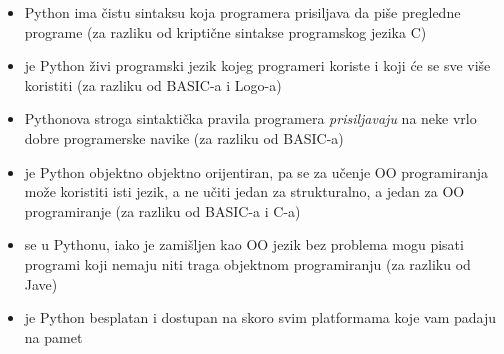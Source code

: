 	\begin{itemize}
		\item Python ima \v{c}istu sintaksu koja programera prisiljava da pi\v{s}e
			pregledne programe (za razliku od kripti\v{c}ne sintakse programskog jezika
			C)
		\item je Python \v{z}ivi programski jezik kojeg programeri koriste i koji \'{c}e
			se sve vi\v{s}e koristiti (za razliku od BASIC-a i Logo-a)
		\item Pythonova stroga sintakti\v{c}ka pravila programera \emph{prisiljavaju} na
			neke vrlo dobre programerske navike (za razliku od BASIC-a)
		\item je Python objektno objektno orijentiran, pa se za u\v{c}enje OO programiranja
			mo\v{z}e koristiti isti jezik, a ne u\v{c}iti jedan za strukturalno, a jedan
			za OO programiranje (za razliku od BASIC-a i C-a)
		\item se u Pythonu, iako je zami\v{s}ljen kao OO jezik bez problema mogu pisati 
			programi koji nemaju niti traga objektnom programiranju (za razliku od Jave)
		\item je Python besplatan i dostupan na skoro svim platformama koje vam padaju
			na pamet
	\end{itemize}
